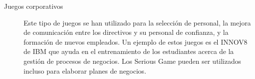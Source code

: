 \begin{description}
\item[Juegos corporativos] Este tipo de juegos se han utilizado para la
	selección de personal, la mejora de comunicación entre los directivos y
	su personal de confianza, y la formación de nuevos empleados. Un ejemplo
	de estos juegos es el INNOV8 de IBM que ayuda en el entrenamiento de los
	estudiantes acerca de la gestión de procesos de negocios. Los Serious
	Game pueden ser utilizados incluso para elaborar planes de
	negocios\cite{education:games}. 

\end{description}

